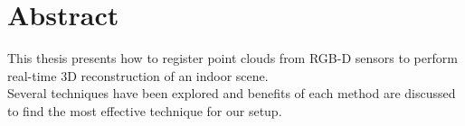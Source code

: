 
\chapter*{Abstract}

This thesis presents how to register point clouds from RGB-D sensors to perform real-time 3D reconstruction of an indoor scene. \\
Several techniques have been explored and benefits of each method are discussed to find the most effective technique for our setup.